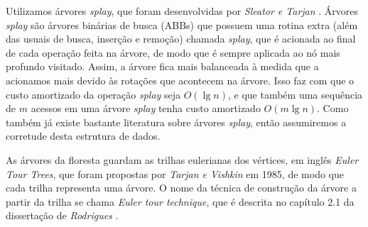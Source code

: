 Utilizamos árvores \textit{splay}, que foram desenvolvidas por \textit{Sleator e Tarjan} \cite{sleator}. Árvores \textit{splay} são árvores binárias de busca (ABBs) que possuem uma rotina extra (além das usuais de busca, inserção e remoção) chamada \textit{splay}, que é acionada ao final de cada operação feita na árvore, de modo que é sempre aplicada ao nó mais profundo visitado. Assim, a árvore fica mais balanceada à medida que a acionamos mais devido às rotações que acontecem na árvore. Isso faz com que o custo amortizado da operação \textit{splay} seja $O(\lg n)$, e que também uma sequência de $m$ acessos em uma árvore \textit{splay} tenha custo amortizado $O(m \lg n)$.  Como também já existe bastante literatura sobre árvores \textit{splay}, então assumiremos a corretude desta estrutura de dados.  

As árvores da floresta guardam as trilhas eulerianas dos vértices, em inglês \textit{Euler Tour Trees}, que foram propostas por \textit{Tarjan e Vishkin} \cite{tarjan} em 1985, de modo que cada trilha representa uma árvore. O nome da técnica de construção da árvore a partir da trilha se chama \textit{Euler tour technique}, que é descrita no capítulo 2.1 da dissertação de \textit{Rodrigues} \cite{arthur}.   
